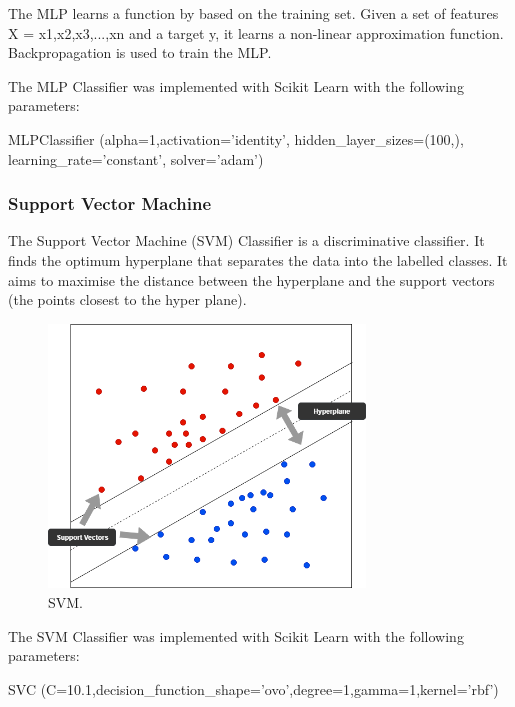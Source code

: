 The MLP learns a function by based on the training set. Given a set of features X = x1,x2,x3,...,xn and a target y, it learns a non-linear approximation function. Backpropagation is used to train the MLP.

The MLP Classifier was implemented with Scikit Learn with the following parameters:

\begin{tcolorbox}
\begin{center}
	MLPClassifier (alpha=1,activation='identity', hidden\_layer\_sizes=(100,), learning\_rate='constant', solver='adam')
\end{center}
\end{tcolorbox}

\subsubsection*{Support Vector Machine}

The Support Vector Machine (SVM) Classifier is a discriminative classifier. It finds the optimum hyperplane that separates the data into the labelled classes. It aims to maximise the distance between the hyperplane and the support vectors (the points closest to the hyper plane).

\begin{figure}[h!]
\centering
\includegraphics[width=0.75\textwidth]{design_and_methodology/svm.png}
\caption{\label{fig:svm} SVM.}
\end{figure}

The SVM Classifier was implemented with Scikit Learn with the following parameters:

\begin{tcolorbox}
\begin{center}
	SVC (C=10.1,decision\_function\_shape='ovo',degree=1,gamma=1,kernel='rbf')
\end{center}
\end{tcolorbox}

